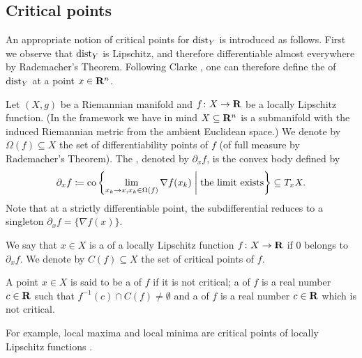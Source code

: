 \subsection{Critical points}

An appropriate notion of critical points for $\operatorname{dist}_Y$ is introduced as follows. First we observe that $\operatorname{dist}_{Y}$ is Lipschitz, and therefore differentiable almost everywhere by Rademacher's Theorem. Following Clarke \cite{Clarke}, one can therefore define the  of $\operatorname{dist}_{Y}$ at a point $x\in \mathbf{R}^n$. 

\begin{definition}[Subdifferential]
\label{D!def:subdifferential}
  Let $(X, g)$ be a Riemannian manifold and  $f \colon X\to \mathbf{R}$
  be a locally Lipschitz function. (In the framework we have in mind $X\subseteq \mathbf{R}^n$ is a submanifold with the induced Riemannian metric from the ambient Euclidean space.) We denote by $\Omega(f) \subseteq X$ the set of differentiability points of $f$ (of full measure by Rademacher's Theorem). The , denoted by $\partial_x f$, is the convex body defined by
  \[
    \partial_xf \coloneq \mathrm{co}\left\{ \lim_{x_k \to x, x_k \in \Omega(f)} \nabla f(x_k) \; \middle| \; \textnormal{the limit exists}\right\} \subseteq T_x X.
  \]
  Note that at a strictly differentiable point, the subdifferential reduces to a singleton $\partial_x f = \{\nabla f(x)\}$.
\end{definition}


\begin{definition}
\label{D!D:critical}
  We say that $x \in X$ is a  of a locally Lipschitz function $f \colon X\to \mathbf{R}$ if $0$ belongs to $\partial_x f$. We denote by $C(f) \subseteq X$ the set of critical points of $f$. 

  A point $x\in X$ is said to be a  of $f$ if it is not critical; a  of $f$ is a real number $c \in \mathbf{R}$ such that $f^{-1}(c) \cap C(f) \neq \emptyset$ and a  of $f$ is a real number $c \in \mathbf{R}$ which is not critical.
\end{definition}

\begin{remark}
  For example, local maxima and local minima are critical points of locally Lipschitz functions \cite{Rockafellar}.
\end{remark}

